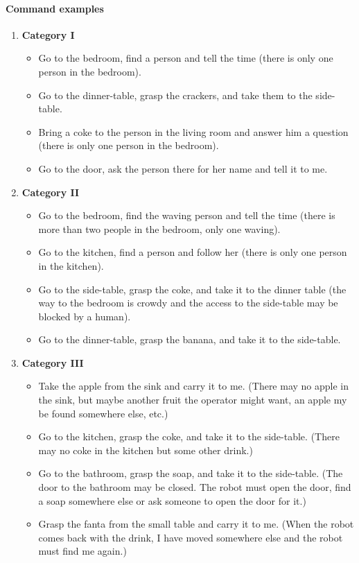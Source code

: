 \paragraph{Command examples}
\begin{enumerate}
	\item \textbf{Category I}
	\begin{itemize}
		\item Go to the bedroom, find a person and tell the time (there is only one person in the bedroom).
		\item Go to the dinner-table, grasp the crackers, and take them to the side-table.
		\item Bring a coke to the person in the living room and answer him a question (there is only one person in the bedroom).
		\item Go to the door, ask the person there for her name and tell it to me.
	\end{itemize}
	\item \textbf{Category II}
	\begin{itemize}
		\item Go to the bedroom, find the waving person and tell the time (there is more than two people in the bedroom, only one waving).
		\item Go to the kitchen, find a person and follow her (there is only one person in the kitchen).
		\item Go to the side-table, grasp the coke, and take it to the dinner table (the way to the bedroom is crowdy and the access to the side-table may be blocked by a human).
		\item Go to the dinner-table, grasp the banana, and take it to the side-table.
	\end{itemize}
	\item \textbf{Category III}
	\begin{itemize}
		\item Take the apple from the sink and carry it to me. 
		  (There may no apple in the sink, but maybe another fruit the operator might want, an apple my be found somewhere else, etc.)
		\item Go to the kitchen, grasp the coke, and take it to the side-table.
		  (There may no coke in the kitchen but some other drink.)		
		  \item Go to the bathroom, grasp the soap, and take it to the side-table.
		  (The door to the bathroom may be closed. The robot must open the door, find a soap somewhere else or ask someone to open the door for it.)
		\item Grasp the fanta from the small table and carry it to me.
		  (When the robot comes back with the drink, I have moved somewhere else and the robot must find me again.)
	\end{itemize} 
\end{enumerate}

